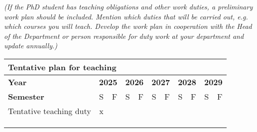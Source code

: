 %
%
\textit{(If the PhD student has teaching obligations and other work duties, a preliminary work plan should be included. Mention which duties that will be carried out, e.g. which courses you will teach. Develop the work plan in cooperation with the Head of the Department or person responsible for duty work at your department and update annually.)}

%
%
\vspace{1cm}
\begin{tabularx}{\textwidth}{|X|c|c|c|c|c|c|c|c|c|c|}
    \hline
    \multicolumn{11}{|l|}{\textbf{Tentative plan for teaching}}\\
    \hline
    \textbf{Year} & \multicolumn{2}{c|}{\textbf{2025}} & \multicolumn{2}{c|}{\textbf{2026}} & \multicolumn{2}{c|}{\textbf{2027}} & \multicolumn{2}{c|}{\textbf{2028}} & \multicolumn{2}{c|}{\textbf{2029}} \\
    \hline
    \textbf{Semester} & S & F & S & F & S & F & S & F & S & F \\
    \hline
    Tentative teaching duty & x & & & & & & & & & \\
    \hline 
     & & & & & & & & & & \\
     \hline 
     & & & & & & & & & & \\
     \hline 
     & & & & & & & & & & \\
     \hline
\end{tabularx}